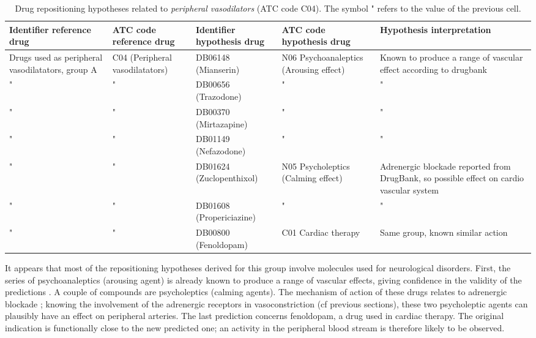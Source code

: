 \begin{table}[htbp]
\scriptsize
\begin{tabular}{|p{2cm}|p{2cm}|p{2cm}|p{3cm}|p{4cm}|}
\hline
\textbf{Identifier reference drug} & \textbf{ATC code reference drug} & \textbf{Identifier hypothesis drug} & \textbf{ATC code hypothesis drug} & \textbf{Hypothesis interpretation} \\ \hline
Drugs used as peripheral vasodilatators, group A & C04 (Peripheral vasodilatators) & DB06148 (Mianserin) & N06 Psychoanaleptics (Arousing effect) & Known to produce a range of vascular effect according to drugbank \\ \hline
" & " & DB00656 (Trazodone) & " & " \\ \hline
" & " & DB00370 (Mirtazapine) & " & " \\ \hline
" & " & DB01149 (Nefazodone) & " & " \\ \hline
" & " & DB01624 (Zuclopenthixol) & N05 Psycholeptics (Calming effect) & Adrenergic blockade reported from DrugBank, so possible effect on cardio vascular system \\ \hline
" & " & DB01608 (Propericiazine) & " & " \\ \hline
" & " & DB00800 (Fenoldopam) & C01 Cardiac therapy & Same group, known similar action \\ \hline
\end{tabular}
\caption{Drug repositioning hypotheses related to \emph{peripheral vasodilators} (ATC code C04). The symbol " refers to the value of the previous cell.}
\label{table:tablec04}
\end{table}

It appears that most of the repositioning hypotheses derived for this group involve molecules used for neurological disorders. First, the series of psychoanaleptics (arousing agent) is already known to produce a range of vascular effects, giving confidence in the validity of the predictions \citep{khalifa2003zuclopenthixol}. A couple of compounds are psycholeptics (calming agents). The mechanism of action of these drugs relates to adrenergic blockade \citep{khalifa2003zuclopenthixol}; knowing the involvement of the adrenergic receptors in vasoconstriction (cf previous sections), these two psycholeptic agents can plausibly have an effect on peripheral arteries. The last prediction concerns fenoldopam, a drug used in cardiac therapy. The original indication is functionally close to the new predicted one; an activity in the peripheral blood stream is therefore likely to be observed.

